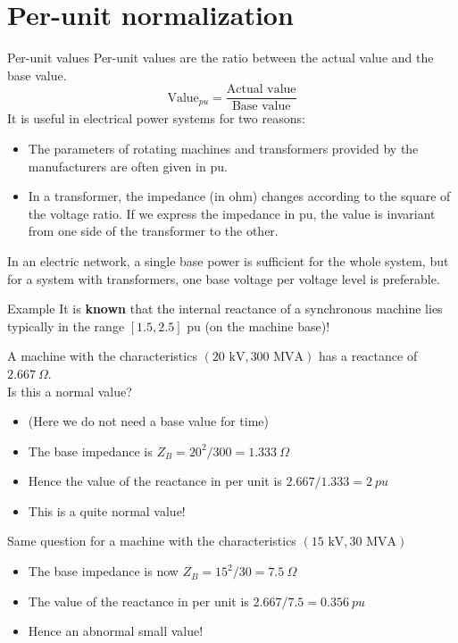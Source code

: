 \section{Per-unit normalization}

\begin{frame}{Per-unit values}
    Per-unit values are the ratio between the actual value and the base value.
    $$
    \text{Value}_{pu} = \frac{\text{Actual value}}{\text{Base value}}
    $$
    It is useful in electrical power systems for two reasons:
    \begin{itemize}
        \item The parameters of rotating machines and transformers provided by the manufacturers are often given in pu.
        \item In a transformer, the impedance (in ohm) changes according to the square of the voltage ratio. If we express the impedance in pu, the value is invariant from one side of the transformer to the other.
    \end{itemize}
    In an electric network, a single base power is sufficient for the whole system, but for a system with transformers, one base voltage per voltage level is preferable.
\end{frame}

\begin{frame}[allowframebreaks]{Example}
    It is \textbf{known} that the internal reactance of a synchronous machine lies typically in the range $[1.5, 2.5] \text{ pu}$ (on the machine base)! 
     
    A machine with the characteristics $(20 \text{ kV}, 300 \text{ MVA})$ has a reactance of $2.667 \ \Omega$.\\ Is this a normal value?
    \begin{itemize}
        \item (Here we do not need a base value for time)
        \item The base impedance is $Z_B = 20^2/300 = 1.333 \ \Omega$
        \item Hence the value of the reactance in per unit is $2.667/1.333 = 2 \ pu$
        \item This is a quite normal value!
    \end{itemize}
    Same question for a machine with the characteristics $(15 \text{ kV}, 30 \text{ MVA})$
    \begin{itemize}
        \item The base impedance is now $Z_B=15^2/30 = 7.5 \ \Omega$
        \item The value of the reactance in per unit is $2.667/7.5 = 0.356 \ pu$
        \item Hence an abnormal small value!
    \end{itemize}
\end{frame}

